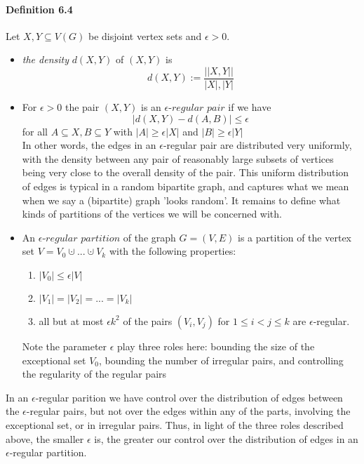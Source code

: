 \paragraph{Definition 6.4} Let $ X,Y \subseteq V(G) $ be disjoint
vertex sets and $ \epsilon > 0 $. 
\begin{itemize}
    \item \textit{the density} $d(X,Y)$ of $(X,Y)$ is 
    $$ d(X,Y) := \frac{||X,Y||}{|X|,|Y|} $$ 
    \item For $ \epsilon > 0 $ the pair $ (X,Y)$ 
    is an $\epsilon$-$regular$ $pair$ if we have 
    $$ |d(X,Y) - d(A,B)| \leq \epsilon $$ 
    for all $ A \subseteq X, B \subseteq Y $ with 
    $|A| \geq \epsilon|X| $ and $ |B| \geq \epsilon|Y| $ \\
    In other words, the edges in an $\epsilon$-regular pair are distributed
    very uniformly, with the density between any pair of reasonably large 
    subsets of vertices being very close to the overall density of the pair.
    This uniform distribution of edges is typical in a random bipartite graph,
    and captures what we mean when we say a (bipartite) graph 'looks random'.
    It remains to define what kinds of partitions of the vertices we will 
    be concerned with.
    \item An $\epsilon$-$regular$ $partition$ of the graph $ G = (V,E) $ is 
    a partition of the vertex set $ V  = V_0 \cupdot ... \cupdot V_k $ with 
    the following properties:
        \begin{enumerate}
            \item $|V_0| \leq \epsilon|V| $
            \item $ |V_1| = |V_2| = ... = |V_k| $
            \item all but at most $ \epsilon k^2$ of the pairs $ (V_i,V_j) $
            for $ 1 \leq i < j \leq k $ are $\epsilon$-regular.
        \end{enumerate}
    Note the parameter $\epsilon$ play three roles here: bounding the size of 
    the exceptional set $ V_0 $, bounding the number of irregular pairs, and 
    controlling the regularity of the regular pairs
\end{itemize}
In an $\epsilon$-regular parition we have control over the distribution of edges 
between the $\epsilon$-regular pairs, but not over the edges within any of the 
parts, involving the exceptional set, or in irregular pairs. Thus, in light of 
the three roles described above, the smaller $\epsilon$ is, the greater our 
control over the distribution of edges in an $\epsilon$-regular partition.

